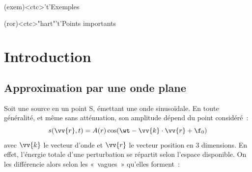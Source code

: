 \documentclass[../../main/main.tex]{subfiles}
\begin{document}
\begin{tcn}[%
		sidebyside, fontupper=\small, fontlower=\small
	]
	\begin{tcn}[nsp](exem)<ctc>'t'{Exemples}
		\vspace{-25pt}
	\end{tcn}
	\begin{tcn}[nsp](ror)<ctc>"hart"'t'{Points importants}
		\vspace{-25pt}
	\end{tcn}
\end{tcn}

\vspace*{\fill}

\newpage

\section{Introduction}
\subsection{Approximation par une onde plane}
Soit une source en un point S, émettant une onde sinusoïdale. En toute
généralité, et même sans atténuation, son amplitude dépend du point considéré~:
\[
	s(\vv{r},t) = A(r) \cos(\wt - \vv{k}\cdot \vv{r} + \f_0)
\]
\smallbreak
\vspace*{-10pt}
\noindent
avec $\vv{k}$ le vecteur d'onde et $\vv{r}$ le vecteur position en 3 dimensions.
En effet, l'énergie totale d'une perturbation se répartit selon l'espace
disponible. On les différencie alors selon les «~vagues~» qu'elles forment~:
\end{document}
